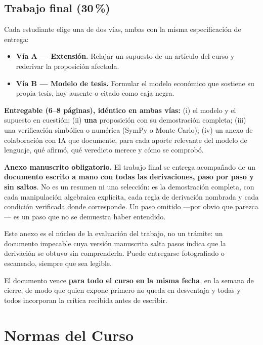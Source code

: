 \documentclass[11pt]{article}
\begin{document}
\subsection*{Trabajo final (30\,\%)}

Cada estudiante elige una de dos v\'ias, ambas con la misma especificaci\'on de entrega:

\begin{itemize}
\item \textbf{V\'ia A --- Extensi\'on.} Relajar un supuesto de un art\'iculo del curso y rederivar la proposici\'on afectada.
\item \textbf{V\'ia B --- Modelo de tesis.} Formular el modelo econ\'omico que sostiene su propia tesis, hoy ausente o citado como caja negra.
\end{itemize}

\textbf{Entregable (6--8 p\'aginas), id\'entico en ambas v\'ias:} (i) el modelo y el supuesto en cuesti\'on; (ii) \textbf{una} proposici\'on con su demostraci\'on completa; (iii) una verificaci\'on simb\'olica o num\'erica (SymPy o Monte Carlo); (iv) un anexo de colaboraci\'on con IA que documente, para cada aporte relevante del modelo de lenguaje, qu\'e afirm\'o, qu\'e veredicto merece y c\'omo se comprob\'o.

\textbf{Anexo manuscrito obligatorio.} El trabajo final se entrega acompa\~nado de un \textbf{documento escrito a mano con todas las derivaciones, paso por paso y sin saltos}. No es un resumen ni una selecci\'on: es la demostraci\'on completa, con cada manipulaci\'on algebraica expl\'icita, cada regla de derivaci\'on nombrada y cada condici\'on verificada donde corresponde. Un paso omitido ---por obvio que parezca--- es un paso que no se demuestra haber entendido.

Este anexo es el n\'ucleo de la evaluaci\'on del trabajo, no un tr\'amite: un documento impecable cuya versi\'on manuscrita salta pasos indica que la derivaci\'on se obtuvo sin comprenderla. Puede entregarse fotografiado o escaneado, siempre que sea legible.

El documento vence \textbf{para todo el curso en la misma fecha}, en la semana de cierre, de modo que quien expone primero no queda en desventaja y todas y todos incorporan la cr\'itica recibida antes de escribir.

\section{Normas del Curso}
\end{document}
